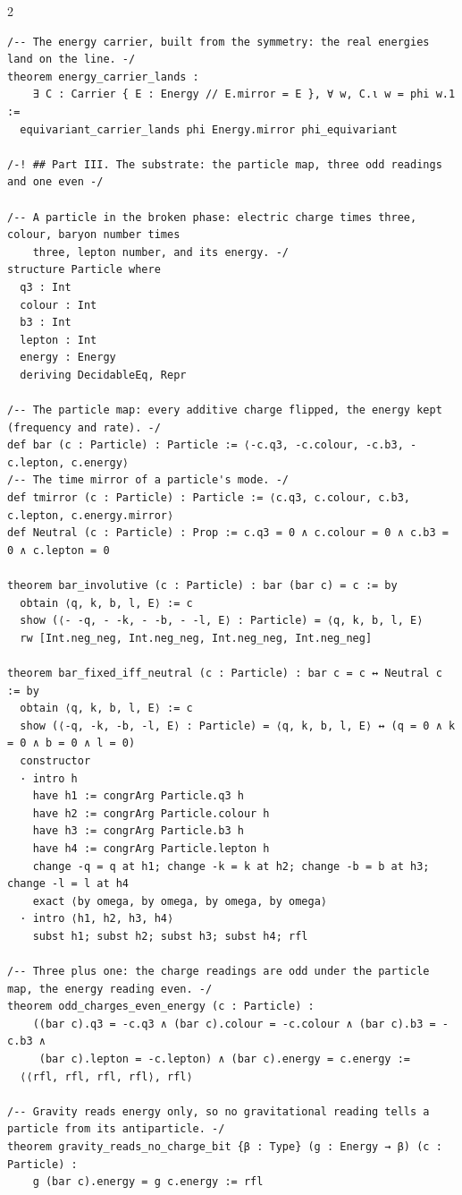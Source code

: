 \documentclass[10pt]{article}
\begin{document}
\begin{multicols}{2}
\begin{Verbatim}[fontsize=\fontsize{5.9}{6.8}\selectfont,breaklines,breakanywhere,breaksymbolleft={}]
/-- The energy carrier, built from the symmetry: the real energies land on the line. -/
theorem energy_carrier_lands :
    ∃ C : Carrier { E : Energy // E.mirror = E }, ∀ w, C.ι w = phi w.1 :=
  equivariant_carrier_lands phi Energy.mirror phi_equivariant

/-! ## Part III. The substrate: the particle map, three odd readings and one even -/

/-- A particle in the broken phase: electric charge times three, colour, baryon number times
    three, lepton number, and its energy. -/
structure Particle where
  q3 : Int
  colour : Int
  b3 : Int
  lepton : Int
  energy : Energy
  deriving DecidableEq, Repr

/-- The particle map: every additive charge flipped, the energy kept (frequency and rate). -/
def bar (c : Particle) : Particle := ⟨-c.q3, -c.colour, -c.b3, -c.lepton, c.energy⟩
/-- The time mirror of a particle's mode. -/
def tmirror (c : Particle) : Particle := ⟨c.q3, c.colour, c.b3, c.lepton, c.energy.mirror⟩
def Neutral (c : Particle) : Prop := c.q3 = 0 ∧ c.colour = 0 ∧ c.b3 = 0 ∧ c.lepton = 0

theorem bar_involutive (c : Particle) : bar (bar c) = c := by
  obtain ⟨q, k, b, l, E⟩ := c
  show (⟨- -q, - -k, - -b, - -l, E⟩ : Particle) = ⟨q, k, b, l, E⟩
  rw [Int.neg_neg, Int.neg_neg, Int.neg_neg, Int.neg_neg]

theorem bar_fixed_iff_neutral (c : Particle) : bar c = c ↔ Neutral c := by
  obtain ⟨q, k, b, l, E⟩ := c
  show (⟨-q, -k, -b, -l, E⟩ : Particle) = ⟨q, k, b, l, E⟩ ↔ (q = 0 ∧ k = 0 ∧ b = 0 ∧ l = 0)
  constructor
  · intro h
    have h1 := congrArg Particle.q3 h
    have h2 := congrArg Particle.colour h
    have h3 := congrArg Particle.b3 h
    have h4 := congrArg Particle.lepton h
    change -q = q at h1; change -k = k at h2; change -b = b at h3; change -l = l at h4
    exact ⟨by omega, by omega, by omega, by omega⟩
  · intro ⟨h1, h2, h3, h4⟩
    subst h1; subst h2; subst h3; subst h4; rfl

/-- Three plus one: the charge readings are odd under the particle map, the energy reading even. -/
theorem odd_charges_even_energy (c : Particle) :
    ((bar c).q3 = -c.q3 ∧ (bar c).colour = -c.colour ∧ (bar c).b3 = -c.b3 ∧
     (bar c).lepton = -c.lepton) ∧ (bar c).energy = c.energy :=
  ⟨⟨rfl, rfl, rfl, rfl⟩, rfl⟩

/-- Gravity reads energy only, so no gravitational reading tells a particle from its antiparticle. -/
theorem gravity_reads_no_charge_bit {β : Type} (g : Energy → β) (c : Particle) :
    g (bar c).energy = g c.energy := rfl


\end{Verbatim}
\end{multicols}
\end{document}

